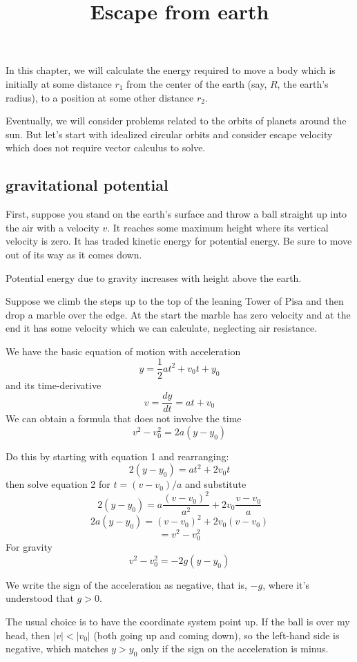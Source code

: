 \documentclass[11pt, oneside]{article}
\title{Escape from earth}
\date{}
\begin{document}
\maketitle
\Large


In this chapter, we will calculate the energy required to move a body which is initially at some distance $r_1$ from the center of the earth (say, $R$, the earth's radius), to a position at some other distance $r_2$.

Eventually, we will consider problems related to the orbits of planets around the sun.  But let's start with idealized circular orbits and consider escape velocity which does not require vector calculus to solve.

\subsection*{gravitational potential}

First, suppose you stand on the earth's surface and throw a ball straight up into the air with a velocity $v$.  It reaches some maximum height where its vertical velocity is zero.  It has traded kinetic energy for potential energy.  Be sure to move out of its way as it comes down.

Potential energy due to gravity increases with height above the earth.

Suppose we climb the steps up to the top of the leaning Tower of Pisa and then drop a marble over the edge.  At the start the marble has zero velocity and at the end it has some velocity which we can calculate, neglecting air resistance.  

We have the basic equation of motion with acceleration
\[ y = \frac{1}{2}at^2 + v_0 t + y_0 \]
and its time-derivative
\[ v = \frac{dy}{dt} = at + v_0 \]
We can obtain a formula that does not involve the time
\[ v^2 - v_0^2 = 2a (y - y_0) \]

Do this by starting with equation 1 and rearranging:
\[ 2(y - y_0) = at^2 + 2v_0 t \]
then solve equation 2 for $t = (v - v_0)/a$ and substitute
\[ 2(y - y_0) = a\frac{(v - v_0)^2}{a^2} + 2v_0 \frac{v - v_0}{a} \]
\[ 2a(y - y_0) = (v - v_0)^2 + 2v_0(v - v_0) \]
\[ = v^2 - v_0^2 \]
For gravity
\[ v^2 - v_0^2 = -2g (y - y_0) \]

We write the sign of the acceleration as negative, that is, $- g$, where it's understood that $g > 0$.  

The usual choice is to have the coordinate system point up.  If the ball is over my head, then $|v| < |v_0|$ (both going up and coming down), so the left-hand side is negative, which matches $y > y_0$ only if the sign on the acceleration is minus.  
\end{document}

